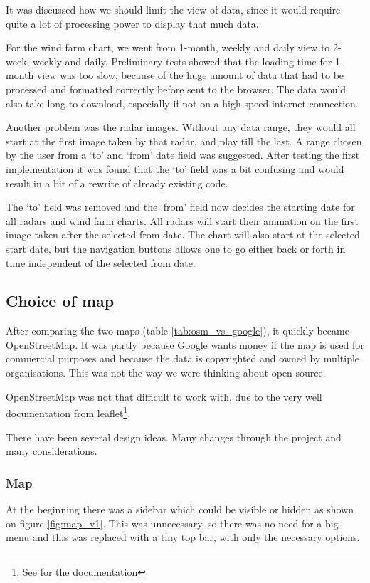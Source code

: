 It was discussed how we should limit the view of data, since it would require quite a lot of processing power to display that much data.

For the wind farm chart, we went from 1-month, weekly and daily view to 2-week, weekly and daily.
Preliminary tests showed that the loading time for 1-month view was too slow, because of the huge amount of data that had to be processed and formatted correctly before sent to the browser. The data would also take long to download, especially if not on a high speed internet connection.

Another problem was the radar images. Without any data range, they would all start at the first image taken by that radar, and play till the last. A range chosen by the user from a `to' and `from' date field was suggested. After testing the first implementation it was found that the `to' field was a bit confusing and would result in a bit of a rewrite of already existing code.

The `to' field was removed and the `from' field now decides the starting date for all radars and wind farm charts.
All radars will start their animation on the first image taken after the selected from date.
The chart will also start at the selected start date, but the navigation buttons allows one to go either back or forth in time independent of the selected from date.

\subsection{Choice of map}
After comparing the two maps (table \ref{tab:osm_vs_google}), it quickly became OpenStreetMap. It was partly because Google wants money if the map is used for commercial purposes and because the data is copyrighted and owned by multiple organisations. This was not the way we were thinking about open source.

OpenStreetMap was not that difficult to work with, due to the very well documentation from leaflet\footnote{See \cite{leaflet} for the documentation}.

There have been several design ideas. Many changes through the project and many considerations.

\subsubsection{Map}
\label{sec:map}
At the beginning there was a sidebar which could be visible or hidden as shown on figure \ref{fig:map_v1}. This was unnecessary, so there was no need for a big menu and this was replaced with a tiny top bar, with only the necessary options.

